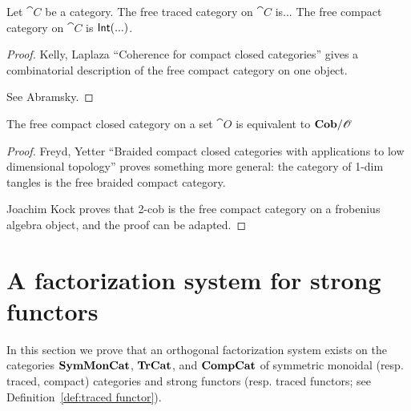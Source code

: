 \documentclass[12pt,oneside,article,draft]{memoir}
\begin{document}
\begin{proposition}\label{prop:free traced and compact}

Let $\cat{C}$ be a category. The free traced category on $\cat{C}$ is... The free compact category on $\cat{C}$ is $\mathsf{Int}(...)$.

\end{proposition}

\begin{proof}

Kelly, Laplaza ``Coherence for compact closed categories'' gives a combinatorial description of the free compact category on one object. 

See Abramsky. 

\end{proof}



\begin{proposition}\label{prop:free compact is Cob}

The free compact closed category on a set $\cat{O}$ is equivalent to $\mathbf{Cob}/\mathscr{O}$

\end{proposition}

\begin{proof}
Freyd, Yetter ``Braided compact closed categories with applications to low dimensional topology'' proves something more general: the category of 1-dim tangles is the free braided compact category. 

Joachim Kock proves that 2-cob is the free compact category on a frobenius algebra object, and the proof can be adapted.
\end{proof}


\section{A factorization system for strong functors}\label{sec:factorization system}

In this section we prove that an orthogonal factorization system exists on the categories $\mathbf{SymMonCat}$, $\mathbf{TrCat}$, and $\mathbf{CompCat}$ of symmetric monoidal (resp. traced, compact) categories and strong functors (resp. traced functors; see Definition~\ref{def:traced functor}). 
\end{document}
